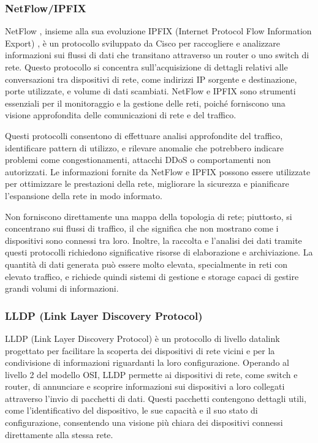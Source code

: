 \documentclass[target=bach,aauheader=,style=]{thud}
\begin{document}
\subsubsection{NetFlow/IPFIX}
NetFlow \cite{cisco_netflow}, insieme alla sua evoluzione IPFIX (Internet Protocol Flow Information Export) \cite{rfc7011}, è un protocollo sviluppato da Cisco per raccogliere e analizzare informazioni sui flussi di dati che transitano attraverso un router o uno switch di rete. Questo protocollo si concentra sull'acquisizione di dettagli relativi alle conversazioni tra dispositivi di rete, come indirizzi IP sorgente e destinazione, porte utilizzate, e volume di dati scambiati. NetFlow e IPFIX sono strumenti essenziali per il monitoraggio e la gestione delle reti, poiché forniscono una visione approfondita delle comunicazioni di rete e del traffico.

Questi protocolli consentono di effettuare analisi approfondite del traffico, identificare pattern di utilizzo, e rilevare anomalie che potrebbero indicare problemi come congestionamenti, attacchi DDoS o comportamenti non autorizzati. Le informazioni fornite da NetFlow e IPFIX possono essere utilizzate per ottimizzare le prestazioni della rete, migliorare la sicurezza e pianificare l'espansione della rete in modo informato.

Non forniscono direttamente una mappa della topologia di rete; piuttosto, si concentrano sui flussi di traffico, il che significa che non mostrano come i dispositivi sono connessi tra loro. Inoltre, la raccolta e l'analisi dei dati tramite questi protocolli richiedono significative risorse di elaborazione e archiviazione. La quantità di dati generata può essere molto elevata, specialmente in reti con elevato traffico, e richiede quindi sistemi di gestione e storage capaci di gestire grandi volumi di informazioni.

\subsubsection{LLDP (Link Layer Discovery Protocol)}
LLDP (Link Layer Discovery Protocol) \cite{ieee_lldp} è un protocollo di livello datalink progettato per facilitare la scoperta dei dispositivi di rete vicini e per la condivisione di informazioni riguardanti la loro configurazione. Operando al livello 2 del modello OSI, LLDP permette ai dispositivi di rete, come switch e router, di annunciare e scoprire informazioni sui dispositivi a loro collegati attraverso l'invio di pacchetti di dati. Questi pacchetti contengono dettagli utili, come l'identificativo del dispositivo, le sue capacità e il suo stato di configurazione, consentendo una visione più chiara dei dispositivi connessi direttamente alla stessa rete.
\end{document}
